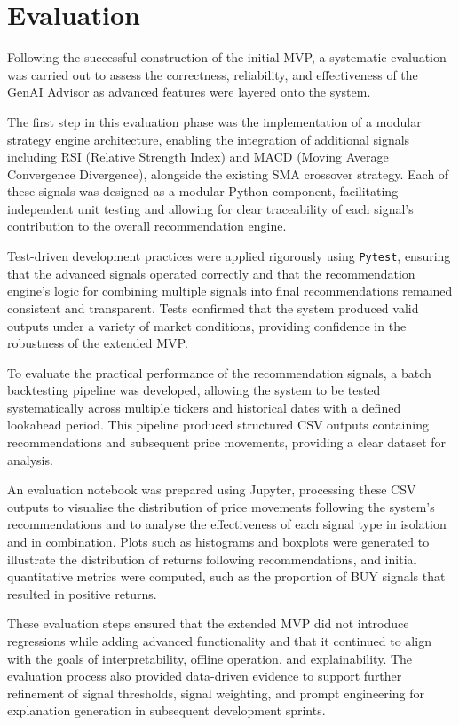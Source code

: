 \section{Evaluation}

Following the successful construction of the initial MVP, a systematic evaluation was carried out to assess the correctness, reliability, and effectiveness of the GenAI Advisor as advanced features were layered onto the system.

The first step in this evaluation phase was the implementation of a modular strategy engine architecture, enabling the integration of additional signals including RSI (Relative Strength Index) and MACD (Moving Average Convergence Divergence), alongside the existing SMA crossover strategy. Each of these signals was designed as a modular Python component, facilitating independent unit testing and allowing for clear traceability of each signal's contribution to the overall recommendation engine.

Test-driven development practices were applied rigorously using \texttt{Pytest}, ensuring that the advanced signals operated correctly and that the recommendation engine's logic for combining multiple signals into final recommendations remained consistent and transparent. Tests confirmed that the system produced valid outputs under a variety of market conditions, providing confidence in the robustness of the extended MVP.

To evaluate the practical performance of the recommendation signals, a batch backtesting pipeline was developed, allowing the system to be tested systematically across multiple tickers and historical dates with a defined lookahead period. This pipeline produced structured CSV outputs containing recommendations and subsequent price movements, providing a clear dataset for analysis.

An evaluation notebook was prepared using Jupyter, processing these CSV outputs to visualise the distribution of price movements following the system's recommendations and to analyse the effectiveness of each signal type in isolation and in combination. Plots such as histograms and boxplots were generated to illustrate the distribution of returns following recommendations, and initial quantitative metrics were computed, such as the proportion of BUY signals that resulted in positive returns.

These evaluation steps ensured that the extended MVP did not introduce regressions while adding advanced functionality and that it continued to align with the goals of interpretability, offline operation, and explainability. The evaluation process also provided data-driven evidence to support further refinement of signal thresholds, signal weighting, and prompt engineering for explanation generation in subsequent development sprints.


